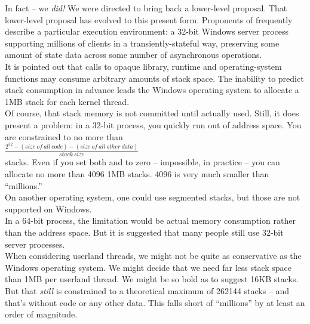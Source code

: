 
In fact -- we \emph{did!}\cite{N3708}\citecomma\cite{N3985} We were directed
to bring back a lower-level proposal. That lower-level proposal has evolved to
this present form.
\newpage
{}
Proponents of \coawait frequently describe a particular execution
environment: a 32-bit Windows server process supporting millions of clients in
a transiently-stateful way, preserving some amount of state data across some
number of asynchronous operations.\\

It is pointed out that calls to opaque library, runtime and operating-system
functions may consume arbitrary amounts of stack space. The inability to
predict stack consumption in advance leads the Windows operating system to
allocate a 1MB stack for each kernel thread.\\

Of course, that stack memory is not committed until actually used. Still, it
does present a problem: in a 32-bit process, you quickly run out of address
space. You are constrained to no more than\\

$ \frac{2^{32} - (size\ of\ all\ code) - (size\ of\ all\ other\ data)}{stack\ size} $\\

stacks. Even if you set both  and  to zero -- impossible, in practice -- you can allocate no more than 4096
1MB stacks. 4096 is very much smaller than ``millions.''\\

On another operating system, one could use segmented stacks, but those are not
supported on Windows.\\

In a 64-bit process, the limitation would be actual memory consumption rather
than the address space. But it is suggested that many people still use 32-bit
server processes.\\

When considering userland threads, we might not be quite as conservative as
the Windows operating system. We might decide that we need far less stack
space than 1MB per userland thread. We might be so bold as to suggest 16KB
stacks. But that \emph{still} is constrained to a theoretical maximum of
262144 stacks -- and that's without code or any other data. This falls short
of ``millions'' by at least an order of magnitude.\\

